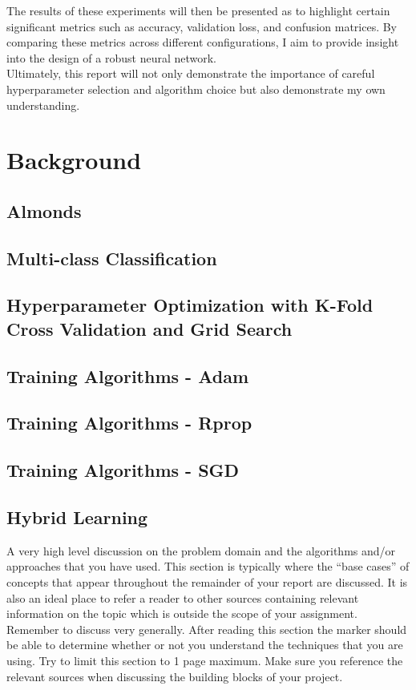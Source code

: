 \documentclass[conference]{IEEEtran}
\begin{document}
The results of these experiments will then be presented as to highlight certain significant metrics such as accuracy, validation loss, and confusion matrices. By comparing these metrics across different configurations, I aim to provide insight into the design of a robust neural network.\\

Ultimately, this report will not only demonstrate the importance of careful hyperparameter selection and algorithm choice but also demonstrate my own understanding.


\section{Background}
\subsection{Almonds}
\subsection{Multi-class Classification}
\subsection{Hyperparameter Optimization with K-Fold Cross Validation and Grid Search}
\subsection{Training Algorithms - Adam}
\subsection{Training Algorithms - Rprop}
\subsection{Training Algorithms - SGD}
\subsection{Hybrid Learning}
A very high level discussion on the problem domain and the algorithms and/or approaches that you have used. This section is typically where the “base cases” of concepts that appear throughout the remainder of your report are discussed. It is also an ideal place to refer a reader to other sources containing relevant information on the topic which is outside the scope of your assignment. Remember to discuss very generally. After reading this section the marker should be able to determine whether or not you understand the techniques that you are using. Try to limit this section to 1 page maximum. Make sure you reference the relevant sources when discussing the building blocks of your project.
\end{document}
